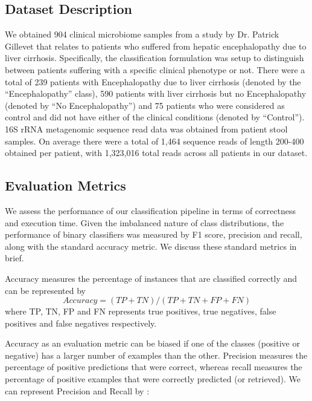 \subsection{Dataset Description}

We obtained 904
clinical microbiome samples from a study by Dr. Patrick Gillevet 
that relates to patients who suffered from hepatic encephalopathy due 
to liver cirrhosis. Specifically, the classification formulation 
was setup to distinguish between patients suffering with a specific 
clinical phenotype or not. There were a total of 239 
patients with Encephalopathy   due to liver cirrhosis (denoted 
by the ``Encephalopathy'' class), 590 patients with liver cirrhosis 
but no Encephalopathy (denoted by ``No Encephalopathy'') 
and 75 patients who were considered as 
control and did not have either of the clinical conditions (denoted by ``Control'').
%
16S rRNA metagenomic sequence read data was 
obtained from patient stool samples. On average 
there were a total of 1,464  sequence reads of length 200-400 obtained per 
patient, with 1,323,016 total reads across all patients in our dataset.



\subsection{Evaluation Metrics}
We assess the performance of our classification pipeline 
in terms of correctness and execution time.
%
Given the imbalanced nature of class distributions,  the 
performance of  binary classifiers was measured by 
F1 score, precision and recall, along with
the standard accuracy metric. We discuss 
these standard metrics in brief.

Accuracy measures the percentage of instances 
that are classified correctly and can 
be represented by 
\begin{equation}
Accuracy = (TP + TN)/ (TP + TN + FP + FN)  \label{eqn:acc} 
\end{equation}
where TP, TN, FP and FN represents true positives, true negatives, false positives and false negatives respectively.

Accuracy as an evaluation metric can be biased if one of the classes 
(positive or negative)  has a larger number of examples than the other.   
Precision measures the percentage of positive predictions that 
were correct, 
whereas recall measures the percentage of positive 
examples that were correctly predicted (or retrieved). 
We can represent Precision and Recall by \cite{Goutte}:

